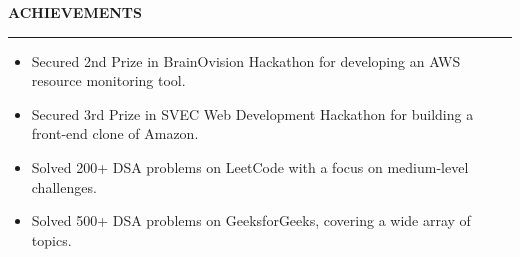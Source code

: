 \documentclass[10pt,a4paper]{article}
\newcommand{\resumesection}[1]{
    \vspace{6pt}
    {\color{primary} \large \textbf{\MakeUppercase{#1}}}
    \vspace{6pt}
    \hrule height 0.8pt
    \vspace{4pt}
}
\begin{document}
\resumesection{Achievements}
\begin{itemize}
    \item Secured 2nd Prize in BrainOvision Hackathon for developing an AWS resource monitoring tool.
    \item Secured 3rd Prize in SVEC Web Development Hackathon for building a front-end clone of Amazon.
    \item Solved 200+ DSA problems on LeetCode with a focus on medium-level challenges.
    \item Solved 500+ DSA problems on GeeksforGeeks, covering a wide array of topics.
\end{itemize}
\end{document}
